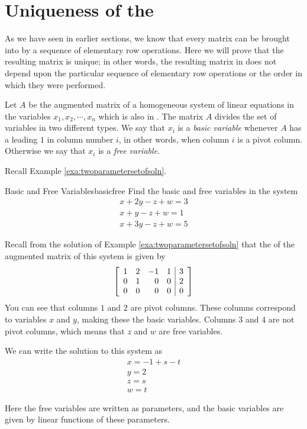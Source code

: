 \section{Uniqueness of the {\RREF}}

As we have seen in earlier sections, we know that every matrix can be brought into {\rref} by a sequence of elementary row operations. Here we will prove that the resulting matrix is unique; in other words, the resulting matrix in {\rref} does not depend upon the particular sequence of elementary row operations or the order in which they were performed. 

Let $A$ be the augmented matrix of a homogeneous system of linear
equations in the variables $x_1, x_2, \cdots, x_n$ which is also in
{\rref}. The matrix $A$ divides the set of variables in two different
types. We say that $x_i$ is a {\em basic variable}     whenever $A$ has
a leading $1$ in column number $i$, in other words, when column $i$ is
a pivot column. Otherwise we say that $x_i$ is a {\em free
variable\em}. 

Recall Example \ref{exa:twoparametersetofsoln}.

\begin{example}{Basic and Free Variables}{basicfree}
Find the basic and free variables in the system
\[
\begin{array}{c}
x+2y-z+w=3 \\
x+y-z+w=1 \\
x+3y-z+w=5
\end{array}
\]
\end{example}

\begin{solution}
Recall from the solution of Example \ref{exa:twoparametersetofsoln} that the {\ef} of the augmented matrix of this system is given by
\[
\left[
\begin{array}{rrrr|r}
1 & 2 & -1 & 1 & 3 \\
0 & 1 & 0 & 0 & 2 \\
0 & 0 & 0 & 0 & 0
\end{array}
\right]  
\]
You can see that columns $1$ and $2$ are pivot columns. These columns correspond to variables $x$ and $y$, making these the basic variables. Columns $3$ and $4$ are not pivot columns, which means that $z$ and $w$ are free variables.

We can write the solution to this system as 
\[
\begin{array}{c}
x=-1+s-t \\
y=2 \\
z=s \\
w=t
\end{array}
\]

Here the free variables are written as parameters, and the basic variables are given by linear functions of these parameters. 
\end{solution}

